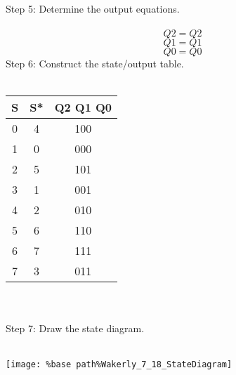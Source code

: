 Step 5: Determine the output equations. \\ \\
$$Q2 = Q2$$
$$Q1 = Q1$$
$$Q0 = Q0$$
Step 6: Construct the state/output table. \\ \\
\begin{tabular}{c|cc}
  \textbf{S} & \textbf{S*} & \textbf{Q2 Q1 Q0} \\ 
  \hline
  0 & 4 & 100 \\
  1 & 0 & 000 \\
  2 & 5 & 101 \\
  3 & 1 & 001 \\
  4 & 2 & 010 \\
  5 & 6 & 110 \\
  6 & 7 & 111 \\
  7 & 3 & 011 \\
\end{tabular} \\ \\
Step 7: Draw the state diagram. \\ \\
\begin{center}
  \texttt{[image: \%base path\%Wakerly\_7\_18\_StateDiagram]}
\end{center}

